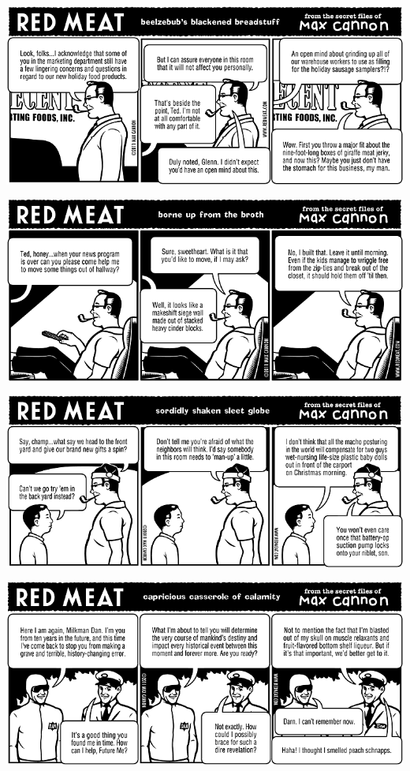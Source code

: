 \documentclass[a4paper,twoside,11pt]{article}
\begin{document}
\includegraphics[width=\textwidth]{redmeat_2011-12-13.png}



\includegraphics[width=\textwidth]{redmeat_2011-12-20.png}



\includegraphics[width=\textwidth]{redmeat_2011-12-27.png}



\includegraphics[width=\textwidth]{redmeat_2012-01-03.png}
\end{document}
